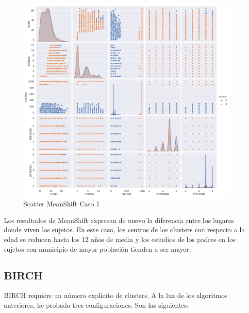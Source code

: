 \begin{figure}[H] %
	\centering
	\includegraphics[scale=0.4]{meanshift-1.png}  %
	\caption{Scatter MeanShift Caso 1} 
	\label{fig:sc-ms-caso1}
\end{figure}

Los resultados de MeanShift expresan de nuevo la diferencia entre los lugares donde viven los sujetos. En este caso, los centros de los clusters con respecto a la edad se reducen hasta los 12 años de media y los estudios de los padres en los sujetos con municipio de mayor población tienden a ser mayor. 

\subsection{BIRCH}

BIRCH requiere un número explícito de clusters. A la luz de los algoritmos anteriores, he probado tres configuraciones. Son las siguientes:

